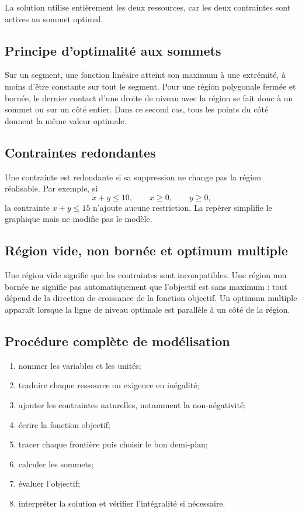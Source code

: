 La solution utilise entièrement les deux ressources, car les deux contraintes sont actives au sommet optimal.

\subsection{Principe d'optimalité aux sommets}

Sur un segment, une fonction linéaire atteint son maximum à une extrémité, à moins d'être constante sur tout le segment. Pour une région polygonale fermée et bornée, le dernier contact d'une droite de niveau avec la région se fait donc à un sommet ou sur un côté entier. Dans ce second cas, tous les points du côté donnent la même valeur optimale.

\subsection{Contraintes redondantes}

Une contrainte est redondante si sa suppression ne change pas la région réalisable. Par exemple, si
\[
x+y\leq10,
\qquad x\geq0,
\qquad y\geq0,
\]
la contrainte $x+y\leq15$ n'ajoute aucune restriction. La repérer simplifie le graphique mais ne modifie pas le modèle.

\subsection{Région vide, non bornée et optimum multiple}

Une région vide signifie que les contraintes sont incompatibles. Une région non bornée ne signifie pas automatiquement que l'objectif est sans maximum : tout dépend de la direction de croissance de la fonction objectif. Un optimum multiple apparaît lorsque la ligne de niveau optimale est parallèle à un côté de la région.

\subsection{Procédure complète de modélisation}

\begin{enumerate}
\item nommer les variables et les unités;
\item traduire chaque ressource ou exigence en inégalité;
\item ajouter les contraintes naturelles, notamment la non-négativité;
\item écrire la fonction objectif;
\item tracer chaque frontière puis choisir le bon demi-plan;
\item calculer les sommets;
\item évaluer l'objectif;
\item interpréter la solution et vérifier l'intégralité si nécessaire.
\end{enumerate}
